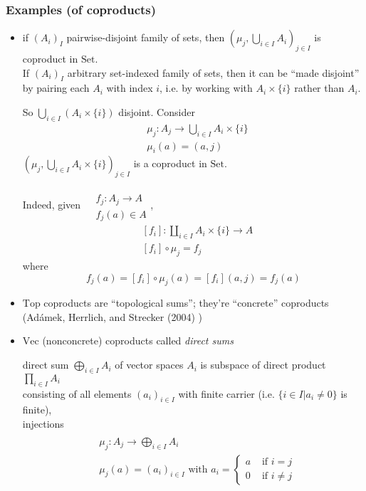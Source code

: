 \documentclass[twoside,landscape,10pt]{amsart}
\theoremstyle{plain}
\theoremstyle{definition}
\theoremstyle{remark}
\begin{document}
\begin{multicols*}{2}
\subsubsection{ Examples (of coproducts)} 

\begin{itemize}
  \item if $(A_i)_I$ pairwise-disjoint family of sets, then $(\mu_j, \bigcup_{i\in I} A_i)_{j\in I}$ is coproduct in $\text{Set}$.  \\
If $(A_i)_I$ arbitrary set-indexed family of sets, then it can be ``made disjoint'' by pairing each $A_i$ with index $i$, i.e. by working with $A_i \times \lbrace i \rbrace$ rather than $A_i$.  

So $\bigcup_{i\in I } (A_i \times \lbrace i \rbrace)$ disjoint.  Consider 
\[
\begin{aligned}
  &  \mu_j : A_j \to \bigcup_{i \in I} A_i \times \lbrace i \rbrace \\ 
  &  \mu_i(a) = (a,j)
\end{aligned}
\]
$(\mu_j, \bigcup_{i\in I} A_i \times \lbrace i \rbrace )_{j\in I}$ is a coproduct in $\text{Set}$.  

Indeed, given $\begin{aligned} & \quad \\
  & f_j:A_j \to A \\
  & f_j(a) \in A \end{aligned}$, 
\[
\begin{aligned}
  & [f_i] : \coprod_{i\in I} A_i \times \lbrace i \rbrace \to A \\ 
  & [f_i]\circ \mu_j = f_j 
\end{aligned}
\]
where
\[
f_j(a) = [f_i]\circ \mu_j(a) = [f_i](a,j) = f_j(a)
\]
  \item  $\text{Top}$ coproducts are ``topological sums''; they're ``concrete'' coproducts (Ad\'{a}mek, Herrlich, and Strecker (2004) \cite{AHS2004})
\item $\text{Vec}$ (nonconcrete) coproducts called \emph{direct sums}

direct sum $\bigoplus_{i\in I} A_i$ of vector spaces $A_i$ is subspace of direct product $\prod_{i\in I} A_i$ \\
consisting of all elements $(a_i)_{i\in I}$ with finite carrier (i.e. $\lbrace i \in I | a_i \neq 0 \rbrace$ is finite), \\
\qquad injections \[
\begin{aligned} & \quad \\
  & \mu_j : A_j \to \bigoplus_{i\in I } A_i  \\
  & \mu_j(a) = (a_i)_{i\in I} \text { with } a_i = \begin{cases} a & \text{ if } i = j  \\ 0 & \text{ if } i \neq j \end{cases}
\end{aligned}
\]


\end{itemize}
\end{multicols*}
\end{document}
